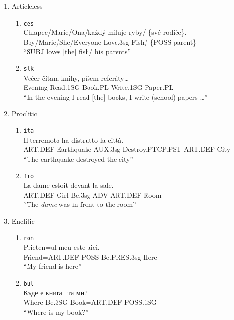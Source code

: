 \documentclass[
  a4paper,
  twoside,
  12pt,
  chapterprefix=false,
  listof=flat]{scrartcl}
\providecommand{\tightlist}{%
  \setlength{\itemsep}{0pt}\setlength{\parskip}{0pt}}
\theoremstyle{plain} %
\theoremstyle{definition}
\theoremstyle{remark}
\begin{document}
\begin{enumerate}
\def\labelenumi{(\arabic{enumi})}
\tightlist
\item
  Articleless \label{exm:dpNo}

  \begin{enumerate}
  \def\labelenumii{\alph{enumii}.}
  \tightlist
  \item
    \texttt{ces} \citep[ 14]{veselovska2014}\\
    \gll    Chlapec/Marie/Ona/každý miluje ryby/ \{své rodiče\}.\\
    Boy/Marie/She/Everyone Love.3sg Fish/ \{POSS parent\}\\
    \glt    \enquote{SUBJ loves {[}the{]} fish/ his parents}
  \item
    \texttt{slk} \citep[ 113]{krizomkrazomA1}\\
    \gll    Večer čítam knihy, píšem referáty\ldots{}\\
    Evening Read.1SG Book.PL Write.1SG Paper.PL\\
    \glt    \enquote{In the evening I read {[}the{]} books, I write (school) papers \ldots{}}
  \end{enumerate}
\item
  Proclitic \label{exm:dpPre}

  \begin{enumerate}
  \def\labelenumii{\alph{enumii}.}
  \tightlist
  \item
    \texttt{ita} \citep[ 60]{bianco2017}\\
    \gll    Il terremoto ha distrutto la città.\\
    ART.DEF Earthquake AUX.3sg Destroy.PTCP.PST ART.DEF City\\
    \glt    \enquote{The earthquake destroyed the city}
  \item
    \texttt{fro} \citep[ 3261]{dedole2008}\\
    \gll    La dame estoit devant la sale.\\
    ART.DEF Girl Be.3sg ADV ART.DEF Room\\
    \glt    \enquote{The \emph{dame} was in front to the room}
  \end{enumerate}
\item
  Enclitic

  \begin{enumerate}
  \def\labelenumii{\alph{enumii}.}
  \tightlist
  \item
    \texttt{ron} \citep[ 45]{cojocaru2003} \label{exm:dpRon}\\
    \gll    Prieten=ul meu este aici.\\
    Friend=ART.DEF POSS Be.PRES.3sg Here\\
    \glt    \enquote{My friend is here}
  \item
    \texttt{bul} \citep[ 37]{leafgren2011} \label{exm:dpBul}\\
    \gll    Къде е книга=та ми?\\
    Where Be.3SG Book=ART.DEF POSS.1SG\\
    \glt    \enquote{Where is my book?}
  \end{enumerate}
\end{enumerate}
\end{document}
